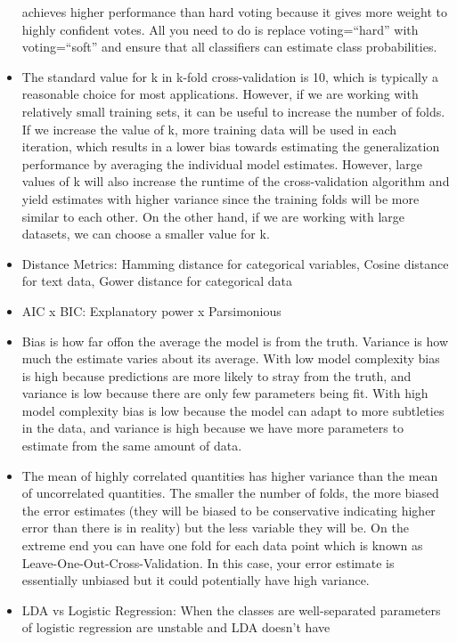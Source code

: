 \documentclass[]{book}
\theoremstyle{definition}
\theoremstyle{definition}
\theoremstyle{definition}
\theoremstyle{remark}
\begin{document}
\begin{itemize}
  achieves higher performance than hard voting because it gives more
  weight to highly confident votes. All you need to do is replace
  voting=``hard'' with voting=``soft'' and ensure that all classifiers
  can estimate class probabilities.
\item
  The standard value for k in k-fold cross-validation is 10, which is
  typically a reasonable choice for most applications. However, if we
  are working with relatively small training sets, it can be useful to
  increase the number of folds. If we increase the value of k, more
  training data will be used in each iteration, which results in a lower
  bias towards estimating the generalization performance by averaging
  the individual model estimates. However, large values of k will also
  increase the runtime of the cross-validation algorithm and yield
  estimates with higher variance since the training folds will be more
  similar to each other. On the other hand, if we are working with large
  datasets, we can choose a smaller value for k.
\item
  Distance Metrics: Hamming distance for categorical variables, Cosine
  distance for text data, Gower distance for categorical data
\item
  AIC x BIC: Explanatory power x Parsimonious
\item
  Bias is how far offon the average the model is from the truth.
  Variance is how much the estimate varies about its average. With low
  model complexity bias is high because predictions are more likely to
  stray from the truth, and variance is low because there are only few
  parameters being fit. With high model complexity bias is low because
  the model can adapt to more subtleties in the data, and variance is
  high because we have more parameters to estimate from the same amount
  of data.
\item
  The mean of highly correlated quantities has higher variance than the
  mean of uncorrelated quantities. The smaller the number of folds, the
  more biased the error estimates (they will be biased to be
  conservative indicating higher error than there is in reality) but the
  less variable they will be. On the extreme end you can have one fold
  for each data point which is known as Leave-One-Out-Cross-Validation.
  In this case, your error estimate is essentially unbiased but it could
  potentially have high variance.
\item
  LDA vs Logistic Regression: When the classes are well-separated
  parameters of logistic regression are unstable and LDA doesn't have

\end{itemize}
\end{document}
